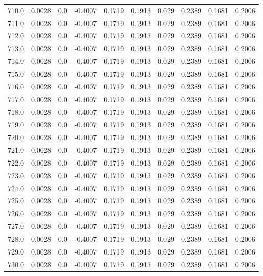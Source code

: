 \begin{longtable}{lrrrrrrrrr}
710.0 & 0.0028 & 0.0 & -0.4007 & 0.1719 & 0.1913 & 0.029 & 0.2389 & 0.1681 & 0.2006 \\
711.0 & 0.0028 & 0.0 & -0.4007 & 0.1719 & 0.1913 & 0.029 & 0.2389 & 0.1681 & 0.2006 \\
712.0 & 0.0028 & 0.0 & -0.4007 & 0.1719 & 0.1913 & 0.029 & 0.2389 & 0.1681 & 0.2006 \\
713.0 & 0.0028 & 0.0 & -0.4007 & 0.1719 & 0.1913 & 0.029 & 0.2389 & 0.1681 & 0.2006 \\
714.0 & 0.0028 & 0.0 & -0.4007 & 0.1719 & 0.1913 & 0.029 & 0.2389 & 0.1681 & 0.2006 \\
715.0 & 0.0028 & 0.0 & -0.4007 & 0.1719 & 0.1913 & 0.029 & 0.2389 & 0.1681 & 0.2006 \\
716.0 & 0.0028 & 0.0 & -0.4007 & 0.1719 & 0.1913 & 0.029 & 0.2389 & 0.1681 & 0.2006 \\
717.0 & 0.0028 & 0.0 & -0.4007 & 0.1719 & 0.1913 & 0.029 & 0.2389 & 0.1681 & 0.2006 \\
718.0 & 0.0028 & 0.0 & -0.4007 & 0.1719 & 0.1913 & 0.029 & 0.2389 & 0.1681 & 0.2006 \\
719.0 & 0.0028 & 0.0 & -0.4007 & 0.1719 & 0.1913 & 0.029 & 0.2389 & 0.1681 & 0.2006 \\
720.0 & 0.0028 & 0.0 & -0.4007 & 0.1719 & 0.1913 & 0.029 & 0.2389 & 0.1681 & 0.2006 \\
721.0 & 0.0028 & 0.0 & -0.4007 & 0.1719 & 0.1913 & 0.029 & 0.2389 & 0.1681 & 0.2006 \\
722.0 & 0.0028 & 0.0 & -0.4007 & 0.1719 & 0.1913 & 0.029 & 0.2389 & 0.1681 & 0.2006 \\
723.0 & 0.0028 & 0.0 & -0.4007 & 0.1719 & 0.1913 & 0.029 & 0.2389 & 0.1681 & 0.2006 \\
724.0 & 0.0028 & 0.0 & -0.4007 & 0.1719 & 0.1913 & 0.029 & 0.2389 & 0.1681 & 0.2006 \\
725.0 & 0.0028 & 0.0 & -0.4007 & 0.1719 & 0.1913 & 0.029 & 0.2389 & 0.1681 & 0.2006 \\
726.0 & 0.0028 & 0.0 & -0.4007 & 0.1719 & 0.1913 & 0.029 & 0.2389 & 0.1681 & 0.2006 \\
727.0 & 0.0028 & 0.0 & -0.4007 & 0.1719 & 0.1913 & 0.029 & 0.2389 & 0.1681 & 0.2006 \\
728.0 & 0.0028 & 0.0 & -0.4007 & 0.1719 & 0.1913 & 0.029 & 0.2389 & 0.1681 & 0.2006 \\
729.0 & 0.0028 & 0.0 & -0.4007 & 0.1719 & 0.1913 & 0.029 & 0.2389 & 0.1681 & 0.2006 \\
730.0 & 0.0028 & 0.0 & -0.4007 & 0.1719 & 0.1913 & 0.029 & 0.2389 & 0.1681 & 0.2006 \\

\end{longtable}
